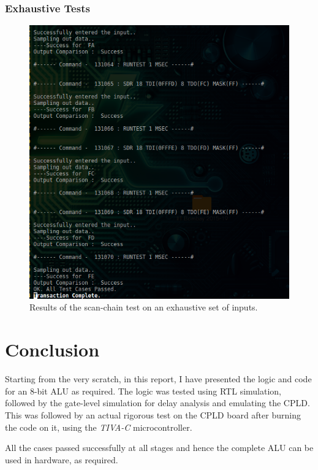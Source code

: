 \documentclass[a4paper, 11pt]{article}
\begin{document}
\subsubsection*{Exhaustive Tests}
\begin{figure}[H]
\centering
\includegraphics[scale=0.66]{Add_Exhaustive}
\caption{Results of the scan-chain test on an exhaustive set of inputs.}
\end{figure}

\section*{Conclusion}
Starting from the very scratch, in this report, I have presented the logic and code for an 8-bit ALU as required. The logic was tested using RTL simulation, followed by the gate-level simulation for delay analysis and emulating the CPLD. This was followed by an actual rigorous test on the CPLD board after burning the code on it, using the \emph{TIVA-C} microcontroller.
\par
All the cases passed successfully at all stages and hence the complete ALU can be used in hardware, as required.
\end{document}
